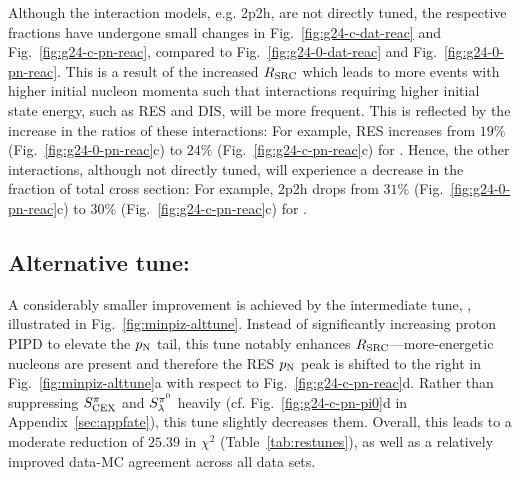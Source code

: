 Although the interaction models, e.g. 2p2h, are not directly tuned, the respective fractions have undergone small changes in Fig.~\ref{fig:g24-c-dat-reac} and Fig.~\ref{fig:g24-c-pn-reac}, compared to Fig.~\ref{fig:g24-0-dat-reac} and Fig.~\ref{fig:g24-0-pn-reac}. 
This is a result of the increased $R_\textrm{SRC}$ which leads to more events with higher initial nucleon momenta such that interactions requiring higher initial state energy, such as RES and DIS, will be more frequent. 
This is reflected by the increase in the ratios of these interactions: For example, RES increases from $19\%$ (Fig.~\ref{fig:g24-0-pn-reac}c) to $24\%$ (Fig.~\ref{fig:g24-c-pn-reac}c) for \minzpi. 
Hence, the other interactions, although not directly tuned, will experience a decrease in the fraction of total cross section: For example, 2p2h drops from $31\%$ (Fig.~\ref{fig:g24-0-pn-reac}c) to $30\%$ (Fig.~\ref{fig:g24-c-pn-reac}c) for \minzpi.



\subsection{Alternative tune: \gT}

A considerably smaller improvement is achieved by the intermediate tune, \gT, illustrated in Fig.~\ref{fig:minpiz-alttune}. Instead of significantly increasing proton PIPD to elevate the $p_\textrm{N}$ tail, this tune notably enhances $R_\textrm{SRC}$---more-energetic nucleons are present and therefore the RES $p_\textrm{N}$ peak is shifted to the right in Fig.~\ref{fig:minpiz-alttune}a with respect to Fig.~\ref{fig:g24-c-pn-reac}d. Rather than suppressing $S_\textrm{CEX}^{\pi}$ and $S_\lambda^{\pi^{0}}$ heavily (cf. Fig.~\ref{fig:g24-c-pn-pi0}d in Appendix~\ref{sec:appfate}), this tune slightly decreases them. Overall, this leads to a moderate reduction of $25.39$ in $\chi^2$ (Table~\ref{tab:restunes}), as well as a relatively improved data-MC agreement across all data sets. 

